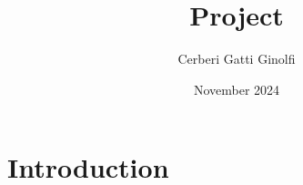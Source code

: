 \documentclass{article}
\title{Project}
\author{Cerberi Gatti Ginolfi}
\date{November 2024}
\begin{document}
\maketitle

\section{Introduction}
\end{document}
